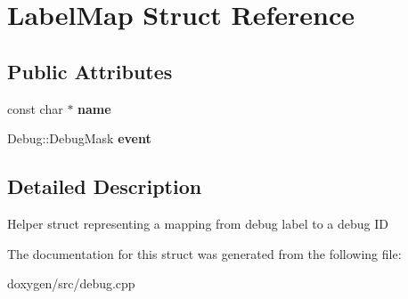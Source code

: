 \hypertarget{struct_label_map}{}\section{Label\+Map Struct Reference}
\label{struct_label_map}
\subsection*{Public Attributes}
\begin{DoxyCompactItemize}
\item 
\mbox{\label{struct_label_map_a8e4084d4e2e1ce2b69c7e8138caedb50}} 
const char $\ast$ {\bfseries name}
\item 
\mbox{\label{struct_label_map_af76882a09bbc3fd8ecc779f612446c52}} 
Debug\+::\+Debug\+Mask {\bfseries event}
\end{DoxyCompactItemize}


\subsection{Detailed Description}
Helper struct representing a mapping from debug label to a debug ID 

The documentation for this struct was generated from the following file\+:\begin{DoxyCompactItemize}
\item 
doxygen/src/debug.\+cpp\end{DoxyCompactItemize}

